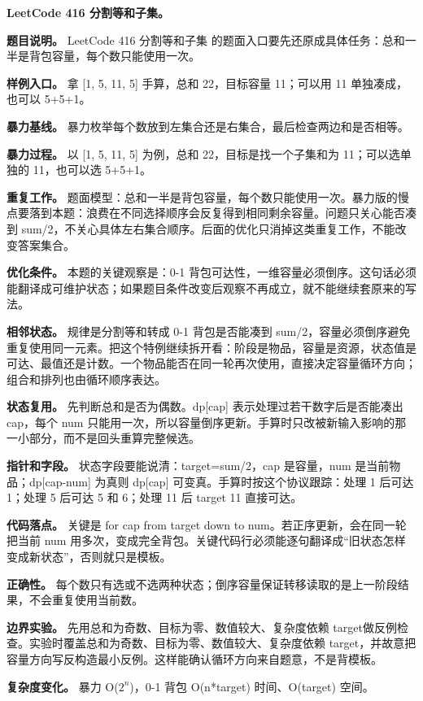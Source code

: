 \noindent\textbf{LeetCode 416 分割等和子集。}

\textbf{题目说明。} LeetCode 416 分割等和子集 的题面入口要先还原成具体任务：总和一半是背包容量，每个数只能使用一次。

\textbf{样例入口。} 拿 [1, 5, 11, 5] 手算，总和 22，目标容量 11；可以用 11 单独凑成，也可以 5+5+1。

\textbf{暴力基线。} 暴力枚举每个数放到左集合还是右集合，最后检查两边和是否相等。

\textbf{暴力过程。} 以 [1, 5, 11, 5] 为例，总和 22，目标是找一个子集和为 11；可以选单独的 11，也可以选 5+5+1。

\textbf{重复工作。} 题面模型：总和一半是背包容量，每个数只能使用一次。暴力版的慢点要落到本题：浪费在不同选择顺序会反复得到相同剩余容量。问题只关心能否凑到 sum/2，不关心具体左右集合顺序。后面的优化只消掉这类重复工作，不能改变答案集合。

\textbf{优化条件。} 本题的关键观察是：0-1 背包可达性，一维容量必须倒序。这句话必须能翻译成可维护状态；如果题目条件改变后观察不再成立，就不能继续套原来的写法。

\textbf{相邻状态。} 规律是分割等和转成 0-1 背包是否能凑到 sum/2，容量必须倒序避免重复使用同一元素。把这个特例继续拆开看：阶段是物品，容量是资源，状态值是可达、最值还是计数。一个物品能否在同一轮再次使用，直接决定容量循环方向；组合和排列也由循环顺序表达。

\textbf{状态复用。} 先判断总和是否为偶数。dp[cap] 表示处理过若干数字后是否能凑出 cap，每个 num 只能用一次，所以容量倒序更新。手算时只改被新输入影响的那一小部分，而不是回头重算完整候选。

\textbf{指针和字段。} 状态字段要能说清：target=sum/2，cap 是容量，num 是当前物品；dp[cap-num] 为真则 dp[cap] 可变真。手算时按这个协议跟踪：处理 1 后可达 1；处理 5 后可达 5 和 6；处理 11 后 target 11 直接可达。

\textbf{代码落点。} 关键是 for cap from target down to num。若正序更新，会在同一轮把当前 num 用多次，变成完全背包。关键代码行必须能逐句翻译成“旧状态怎样变成新状态”，否则就只是模板。

\textbf{正确性。} 每个数只有选或不选两种状态；倒序容量保证转移读取的是上一阶段结果，不会重复使用当前数。

\textbf{边界实验。} 先用总和为奇数、目标为零、数值较大、复杂度依赖 target做反例检查。实验时覆盖总和为奇数、目标为零、数值较大、复杂度依赖 target，并故意把容量方向写反构造最小反例。这样能确认循环方向来自题意，不是背模板。

\textbf{复杂度变化。} 暴力 O(\ensuremath{2^{n}})，0-1 背包 O(n*target) 时间、O(target) 空间。

